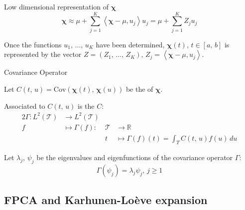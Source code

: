 \begin{definition}{Low dimensional representation of $\boldsymbol \chi$}{}
	\begin{equation*}
		\boldsymbol \chi \approx \mu + \sum_{j=1}^K \left\langle
		\boldsymbol \chi - \mu, u_j
		\right\rangle u_j = \mu + \sum_{j=1}^K Z_j u_j
	\end{equation*}

	Once the functions $u_1,\, \dots,\, u_K$ have been determined, $\boldsymbol \chi(t),\,t\in[a,\,b]$
	is represented by the vector $Z = (Z_1,\, \dots,\, Z_K),\, Z_j = \left\langle
		\boldsymbol \chi - \mu, u_j
		\right\rangle$.
\end{definition}

\begin{definition}{Covariance Operator}{}

	Let $C(t,\,u) = \text{Cov} \left( \boldsymbol \chi(t),\, \boldsymbol \chi(u) \right)$ be
	the  of $\boldsymbol \chi$.

	Associated to $C(t,\,u)$ is the  $C$:
	\begin{alignat*}{2}
		\Gamma : L^2(\mathcal T) & \to L^2(\mathcal T) &             &                                                   \\
		f                        & \mapsto \Gamma(f) : & \mathcal  T & \to \mathds R                                     \\
		                         &                     & t           & \mapsto \Gamma(f)(t) = \int_T C(t,\,u) f(u) \, du
	\end{alignat*}

	Let $\lambda_j,\,\psi_j$ be the eigenvalues and eigenfunctions of the
	covariance operator $\Gamma$:
	\begin{equation*}
		\Gamma(\psi_j) = \lambda_j \psi_j,\,j \geq 1
	\end{equation*}
\end{definition}

\subsection{FPCA and Karhunen-Loève expansion}

